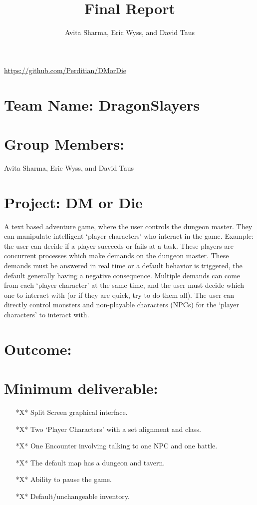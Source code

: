 \documentclass{article}
\author{Avita Sharma, Eric Wyss, and David Taus}
\title{\textbf{Final Report}}
\date{}
\theoremstyle{definition}
\begin{document}
\maketitle
\href{https://github.com/Perditian/DMorDie}{https://github.com/Perditian/DMorDie}
\section*{Team Name: DragonSlayers}
\section*{Group Members:}
 Avita Sharma, Eric Wyss, and David Taus
\section*{Project: DM or Die}

A text based adventure game, where the user controls the dungeon master. They can 
manipulate intelligent `player characters' who interact in the game. Example: the
user can decide if a player succeeds or fails at a task. These players are 
concurrent processes which make demands on the dungeon master. These demands
must be answered in real time or a default behavior is triggered, the default
generally having a negative consequence. Multiple demands can come from each 
`player character' at the same time, and the user must decide which one to interact 
with (or if they are quick, try to do them all). The user can directly control
monsters and non-playable characters (NPCs) for the `player characters' to interact 
with.
\section*{\huge{Outcome:}}
\section*{Minimum deliverable:}
\begin{enumerate}
\item [*X*] Split Screen graphical interface.
\item [*X*] Two `Player Characters' with a set alignment and class.
\item [*X*] One Encounter involving talking to one NPC and one battle. 
\item [*X*] The default map has a dungeon and tavern.
\item [*X*] Ability to pause the game.
\item [*X*] Default/unchangeable inventory.
\end{enumerate}
\end{document}
